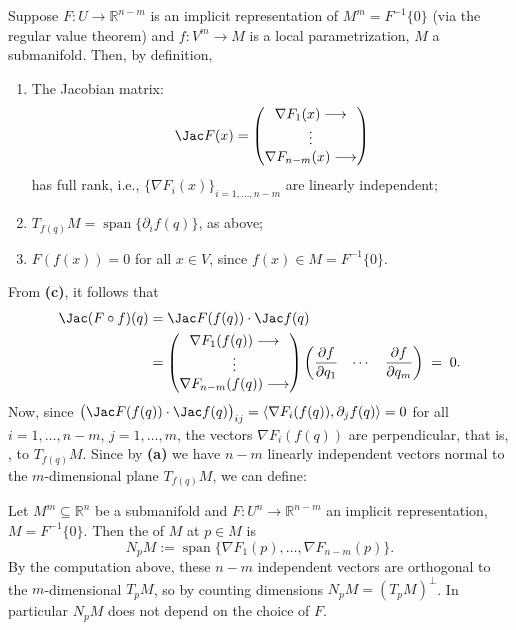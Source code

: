 Suppose $F : U \to \mathbb{R}^{n-m}$ is an implicit representation of $M^m = F^{-1}\{0\}$ (via the
regular value theorem) and $f : V^m \to M$ is a local parametrization, $M$ a submanifold. Then, by
definition,
\begin{enumerate}[label=\textbf{(\alph*)}]
  \item The Jacobian matrix:
\[ \Jac F(x) = \begin{pmatrix} \nabla F_1(x) \longrightarrow \\ \vdots \\ \nabla F_{n-m}(x) \longrightarrow \end{pmatrix} \]
    has full rank, i.e., $\{\nabla F_i(x)\}_{i=1,\dots,n-m}$ are linearly independent;
  \item $T_{f(q)}M = \operatorname{span}\{\partial_if(q)\}$, as above;
  \item $F(f(x)) = 0$ for all $x \in V$, since $f(x) \in M = F^{-1}\{0\}$.
\end{enumerate}
From \textbf{(c)}, it follows that
\begin{align*}
\Jac(F\circ f)(q)
  &= \Jac F(f(q))\cdot\Jac f(q) \\
  &= \begin{pmatrix} \nabla F_1(f(q)) \longrightarrow \\ \vdots \\ \nabla F_{n-m}(f(q)) \longrightarrow \end{pmatrix}
     \begin{pmatrix} \dfrac{\partial f}{\partial q_1} & \cdots & \dfrac{\partial f}{\partial q_m}\end{pmatrix}
   \;=\; 0.
\end{align*}
Now, since $\big(\Jac F(f(q))\cdot\Jac f(q)\big)_{ij} = \langle \nabla F_i(f(q)), \partial_jf(q)\rangle = 0$
for all $i=1,\dots,n-m$, $j=1,\dots,m$, the vectors $\nabla F_i(f(q))$ are perpendicular, that is,
, to $T_{f(q)}M$. Since by \textbf{(a)} we have $n-m$ linearly independent vectors
normal to the $m$-dimensional plane $T_{f(q)}M$, we can define:

\begin{definition}
\label{def:normal_space}
Let $M^m \subseteq \mathbb{R}^n$ be a submanifold and $F : U^n \to \mathbb{R}^{n-m}$ an implicit
representation, $M = F^{-1}\{0\}$. Then the   of
$M$ at $p \in M$ is
\[N_pM := \operatorname{span}\{\nabla F_1(p),\dots,\nabla F_{n-m}(p)\}.\]
By the computation above, these $n-m$ independent vectors are orthogonal to the $m$-dimensional
$T_pM$, so by counting dimensions $N_pM = (T_pM)^\perp$. In particular $N_pM$ does not depend on
the choice of $F$.
\end{definition}

